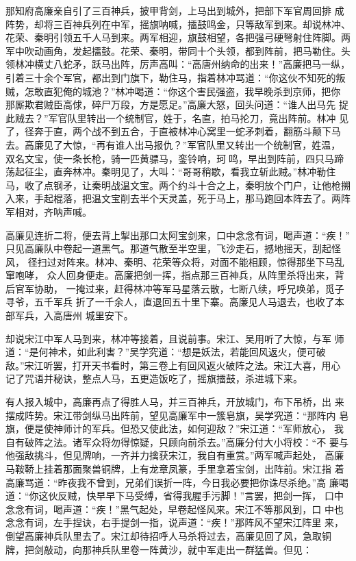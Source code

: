 那知府高廉亲自引了三百神兵，披甲背剑，上马出到城外，把部下军官周回排
成阵势，却将三百神兵列在中军，摇旗呐喊，擂鼓鸣金，只等敌军到来。却说林冲、
花荣、秦明引领五千人马到来。两军相迎，旗鼓相望，各把强弓硬弩射住阵脚。两
军中吹动画角，发起擂鼓。花荣、秦明，带同十个头领，都到阵前，把马勒住。头
领林冲横丈八蛇矛，跃马出阵，厉声高叫：“高唐州纳命的出来！”高廉把马一纵，
引着三十余个军官，都出到门旗下，勒住马，指着林冲骂道：“你这伙不知死的叛
贼，怎敢直犯俺的城池？”林冲喝道：“你这个害民强盗，我早晚杀到京师，把你
那厮欺君贼臣高俅，碎尸万段，方是愿足。”高廉大怒，回头问道：“谁人出马先
捉此贼去？”军官队里转出一个统制官，姓于，名直，拍马抡刀，竟出阵前。林冲
见了，径奔于直，两个战不到五合，于直被林冲心窝里一蛇矛刺着，翻筋斗颠下马
去。高廉见了大惊，“再有谁人出马报仇？”军官队里又转出一个统制官，姓温，
双名文宝，使一条长枪，骑一匹黄骠马，銮铃响，珂鸣，早出到阵前，四只马蹄
荡起征尘，直奔林冲。秦明见了，大叫：“哥哥稍歇，看我立斩此贼。”林冲勒住
马，收了点钢矛，让秦明战温文宝。两个约斗十合之上，秦明放个门户，让他枪搠
入来，手起棍落，把温文宝削去半个天灵盖，死于马上，那马跑回本阵去了。两阵
军相对，齐呐声喊。

高廉见连折二将，便去背上掣出那口太阿宝剑来，口中念念有词，喝声道：“疾！”
只见高廉队中卷起一道黑气。那道气散至半空里，飞沙走石，撼地摇天，刮起怪风，
径扫过对阵来。林冲、秦明、花荣等众将，对面不能相顾，惊得那坐下马乱窜咆哮，
众人回身便走。高廉把剑一挥，指点那三百神兵，从阵里杀将出来，背后官军协助，
一掩过来，赶得林冲等军马星落云散，七断八续，呼兄唤弟，觅子寻爷，五千军兵
折了一千余人，直退回五十里下寨。高廉见人马退去，也收了本部军兵，入高唐州
城里安下。

却说宋江中军人马到来，林冲等接着，且说前事。宋江、吴用听了大惊，与军
师道：“是何神术，如此利害？”吴学究道：“想是妖法，若能回风返火，便可破
敌。”宋江听罢，打开天书看时，第三卷上有回风返火破阵之法。宋江大喜，用心
记了咒语并秘诀，整点人马，五更造饭吃了，摇旗擂鼓，杀进城下来。

有人报入城中，高廉再点了得胜人马，并三百神兵，开放城门，布下吊桥，出
来摆成阵势。宋江带剑纵马出阵前，望见高廉军中一簇皂旗，吴学究道：“那阵内
皂旗，便是使神师计的军兵。但恐又使此法，如何迎敌？”宋江道：“军师放心，
我自有破阵之法。诸军众将勿得惊疑，只顾向前杀去。”高廉分付大小将校：“不
要与他强敌挑斗，但见牌响，一齐并力擒获宋江，我自有重赏。”两军喊声起处，
高廉马鞍鞒上挂着那面聚兽铜牌，上有龙章凤篆，手里拿着宝剑，出阵前。宋江指
着高廉骂道：“昨夜我不曾到，兄弟们误折一阵，今日我必要把你诛尽杀绝。”高
廉喝道：“你这伙反贼，快早早下马受缚，省得我腥手污脚！”言罢，把剑一挥，
口中念念有词，喝声道：“疾！”黑气起处，早卷起怪风来。宋江不等那风到，口
中也念念有词，左手捏诀，右手提剑一指，说声道：“疾！”那阵风不望宋江阵里
来，倒望高廉神兵队里去了。宋江却待招呼人马杀将过去，高廉见回了风，急取铜
牌，把剑敲动，向那神兵队里卷一阵黄沙，就中军走出一群猛兽。但见：

